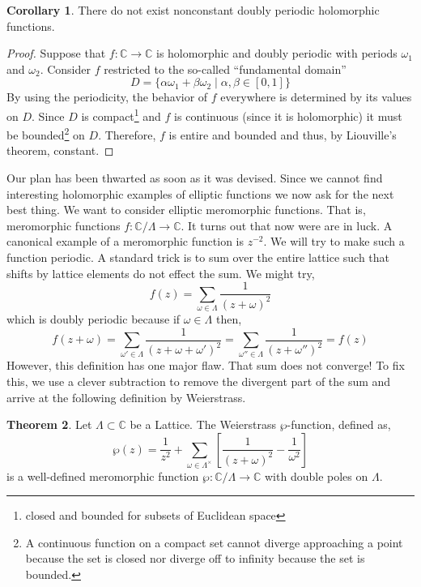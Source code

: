 \documentclass{article}
\newcommand{\C}{\mathbb{C}}
\theoremstyle{definition}
\newtheorem{theorem}{Theorem}[section]
\newtheorem{corollary}[theorem]{Corollary}
\begin{document}
\begin{corollary}
There do not exist nonconstant doubly periodic holomorphic functions.
\end{corollary}

\begin{proof}
Suppose that $f : \C \to \C$ is holomorphic and doubly periodic with periods $\omega_1$ and $\omega_2$. Consider $f$ restricted to the so-called ``fundamental domain''
\[ D = \{ \alpha \omega_1 + \beta \omega_2 \mid \alpha, \beta \in [0, 1] \} \]
By using the periodicity, the behavior of $f$ everywhere is determined by its values on $D$. 
Since $D$ is compact\footnote{closed and bounded for subsets of Euclidean space} and $f$ is continuous (since it is holomorphic) it must be bounded\footnote{A continuous function on a compact set cannot diverge approaching a point because the set is closed nor diverge off to infinity because the set is bounded.} on $D$. Therefore, $f$ is entire and bounded and thus, by Liouville's theorem, constant. 
\end{proof}
Our plan has been thwarted as soon as it was devised. Since we cannot find interesting holomorphic examples of elliptic functions we now ask for the next best thing.
We want to consider elliptic meromorphic functions. That is, meromorphic functions $f : \C / \Lambda \to \C$. It turns out that now were are in luck. A canonical example of a meromorphic function is $z^{-2}$. We will try to make such a function periodic. A standard trick is to sum over the entire lattice such that shifts by lattice elements do not effect the sum. We might try,
\[ f(z) = \sum_{\omega \in \Lambda} \frac{1}{(z + \omega)^2} \] 
which is doubly periodic because if $\omega \in \Lambda$ then,
\[ f(z + \omega) = \sum_{\omega' \in \Lambda} \frac{1}{(z + \omega + \omega')^2} = \sum_{\omega'' \in \Lambda} \frac{1}{(z + \omega'')^2} = f(z) \]
However, this definition has one major flaw. That sum does not converge! To fix this, we use a clever subtraction to remove the divergent part of the sum and arrive at the following definition by Weierstrass. 

\begin{theorem}
Let $\Lambda \subset \C$ be a Lattice. The Weierstrass $\wp$-function, defined as,
\[ \wp(z) = \frac{1}{z^2} + \sum_{\omega \in \Lambda^\times } \left[ \frac{1}{(z + \omega)^2} - \frac{1}{\omega^2} \right] \]
is a well-defined meromorphic function $\wp : \C / \Lambda \to \C$ with double poles on $\Lambda$. 
\end{theorem}
\end{document}
